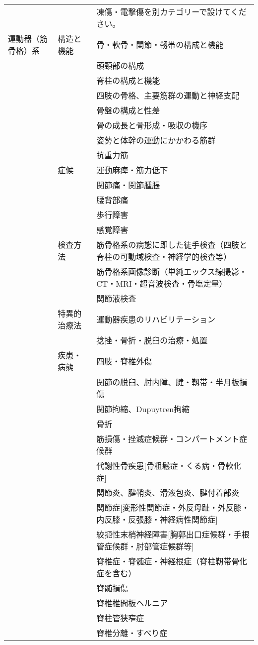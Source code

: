 \begin{xltabular}{\linewidth}{XXX}
 &  & 凍傷・電撃傷を別カテゴリーで設けてください。 \\
運動器（筋骨格）系 & 構造と機能 & 骨・軟骨・関節・靱帯の構成と機能 \\
 &  & 頭頸部の構成 \\
 &  & 脊柱の構成と機能 \\
 &  & 四肢の骨格、主要筋群の運動と神経支配 \\
 &  & 骨盤の構成と性差 \\
 &  & 骨の成長と骨形成・吸収の機序 \\
 &  & 姿勢と体幹の運動にかかわる筋群 \\
 &  & 抗重力筋 \\
 & 症候 & 運動麻痺・筋力低下 \\
 &  & 関節痛・関節腫脹 \\
 &  & 腰背部痛 \\
 &  & 歩行障害 \\
 &  & 感覚障害 \\
 & 検査方法 & 筋骨格系の病態に即した徒手検査（四肢と脊柱の可動域検査・神経学的検査等） \\
 &  & 筋骨格系画像診断（単純エックス線撮影・CT・MRI・超音波検査・骨塩定量） \\
 &  & 関節液検査 \\
 & 特異的治療法 & 運動器疾患のリハビリテーション \\
 &  & 捻挫・骨折・脱臼の治療・処置 \\
 & 疾患・病態 & 四肢・脊椎外傷 \\
 &  & 関節の脱臼、肘内障、腱・靱帯・半月板損傷 \\
 &  & 関節拘縮、Dupuytren拘縮 \\
 &  & 骨折 \\
 &  & 筋損傷・挫滅症候群・コンパートメント症候群 \\
 &  & 代謝性骨疾患[骨粗鬆症・くる病・骨軟化症] \\
 &  & 関節炎、腱鞘炎、滑液包炎、腱付着部炎 \\
 &  & 関節症[変形性関節症・外反母趾・外反膝・内反膝・反張膝・神経病性関節症] \\
 &  & 絞扼性末梢神経障害[胸郭出口症候群・手根管症候群・肘部管症候群等] \\
 &  & 脊椎症・脊髄症・神経根症（脊柱靭帯骨化症を含む） \\
 &  & 脊髄損傷 \\
 &  & 脊椎椎間板ヘルニア \\
 &  & 脊柱管狭窄症 \\
 &  & 脊椎分離・すべり症 \\

\end{xltabular}
